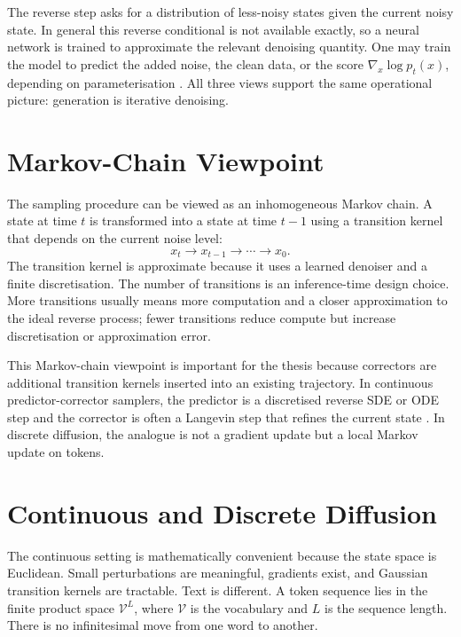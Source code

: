 The reverse step asks for a distribution of less-noisy states given the current
noisy state. In general this reverse conditional is not available exactly, so a
neural network is trained to approximate the relevant denoising quantity. One
may train the model to predict the added noise, the clean data, or the score
$\nabla_x \log p_t(x)$, depending on parameterisation
\parencite{song2019ncsn,vincent2011connection}. All three views support the
same operational picture: generation is iterative denoising.

\section{Markov-Chain Viewpoint}
\label{sec:ch2-markov-view}

The sampling procedure can be viewed as an inhomogeneous Markov chain. A state
at time $t$ is transformed into a state at time $t-1$ using a transition kernel
that depends on the current noise level:
\[
  x_t \longrightarrow x_{t-1} \longrightarrow \cdots \longrightarrow x_0 .
\]
The transition kernel is approximate because it uses a learned denoiser and a
finite discretisation. The number of transitions is an inference-time design
choice. More transitions usually means more computation and a closer
approximation to the ideal reverse process; fewer transitions reduce compute
but increase discretisation or approximation error.

This Markov-chain viewpoint is important for the thesis because correctors are
additional transition kernels inserted into an existing trajectory. In
continuous predictor-corrector samplers, the predictor is a discretised reverse
SDE or ODE step and the corrector is often a Langevin step that refines the
current state \parencite{song2021score}. In discrete diffusion, the analogue is
not a gradient update but a local Markov update on tokens.

\section{Continuous and Discrete Diffusion}
\label{sec:ch2-continuous-discrete}

The continuous setting is mathematically convenient because the state space is
Euclidean. Small perturbations are meaningful, gradients exist, and Gaussian
transition kernels are tractable. Text is different. A token sequence lies in
the finite product space $\mathcal{V}^L$, where $\mathcal{V}$ is the
vocabulary and $L$ is the sequence length. There is no infinitesimal move from
one word to another.

